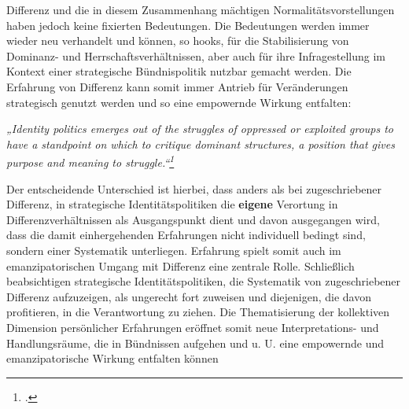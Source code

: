 \noindent Differenz und die in diesem Zusammenhang mächtigen Normalitätsvorstellungen
haben jedoch keine fixierten Bedeutungen. Die Bedeutungen werden immer wieder
neu verhandelt und können, so hooks, für die Stabilisierung von Dominanz- und
Herrschaftsverhältnissen, aber auch für ihre Infragestellung im Kontext einer
strategische Bündnispolitik nutzbar gemacht werden. Die Erfahrung von Differenz
kann somit immer Antrieb für Veränderungen strategisch genutzt werden und so
eine empowernde Wirkung entfalten:
\begin{myenv}
  \textit{„Identity politics emerges out of the struggles of oppressed or
    exploited groups to have a standpoint on which to critique dominant
    structures, a position that gives purpose and meaning to
    struggle.“\footnotemark \footcitetext[88]{bellhooks}
    }
\end{myenv}
Der entscheidende Unterschied ist hierbei, dass anders als bei zugeschriebener
Differenz, in strategische Identitätspolitiken die \textbf{eigene} Verortung in
Differenzverhältnissen als Ausgangspunkt dient und davon ausgegangen wird, dass
die damit einhergehenden Erfahrungen nicht individuell bedingt sind, sondern
einer Systematik unterliegen. Erfahrung spielt somit auch im emanzipatorischen
Umgang mit Differenz eine zentrale Rolle. Schließlich beabsichtigen
strategische Identitätspolitiken, die Systematik von zugeschriebener Differenz
aufzuzeigen, als ungerecht fort zuweisen und diejenigen, die davon profitieren,
in die Verantwortung zu ziehen. Die Thematisierung der kollektiven Dimension
persönlicher Erfahrungen eröffnet somit neue Interpretations- und
Handlungsräume, die in Bündnissen aufgehen und u. U. eine empowernde und
emanzipatorische Wirkung entfalten können\\

